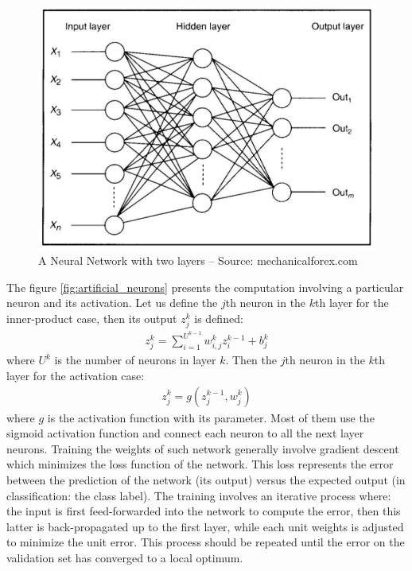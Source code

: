 \documentclass[a4paper,12pt]{report}
\begin{document}
\begin{figure}[h]
    \begin{center}
        \includegraphics{thesis_figures/NN.jpg}
    \end{center}
    \caption{A Neural Network with two layers -- Source: mechanicalforex.com}
    \label{fig:neural_network}
\end{figure}

The figure \ref{fig:artificial_neurons} presents the computation involving a particular neuron and its activation.
Let us define the $j$th neuron in the $k$th layer for the inner-product case, then its output $z^k_j$ is defined:
\begin{eqnarray}
    z^k_j = \sum_{i=1}^{U^{k-1}} w^k_{i,j} z^{k-1}_i + b^k_j
\end{eqnarray}
where $U^k$ is the number of neurons in layer $k$.
Then the $j$th neuron in the $k$th layer for the activation case:
\begin{eqnarray}
    z^k_j = g(z^{k-1}_j, w^k_{j})
\end{eqnarray}
where $g$ is the activation function with its parameter.
Most of them use the sigmoid activation function and connect each neuron to all the next layer neurons.
Training the weights of such network generally involve gradient descent which minimizes the loss function of the network.
This loss represents the error between the prediction of the network (its output) versus the expected output (in classification: the class label).
The training involves an iterative process where: the input is first feed-forwarded into the network to compute the error, then this latter is back-propagated up to the first layer, while each unit weights is adjusted to minimize the unit error.
This process should be repeated until the error on the validation set has converged to a local optimum.
\end{document}
